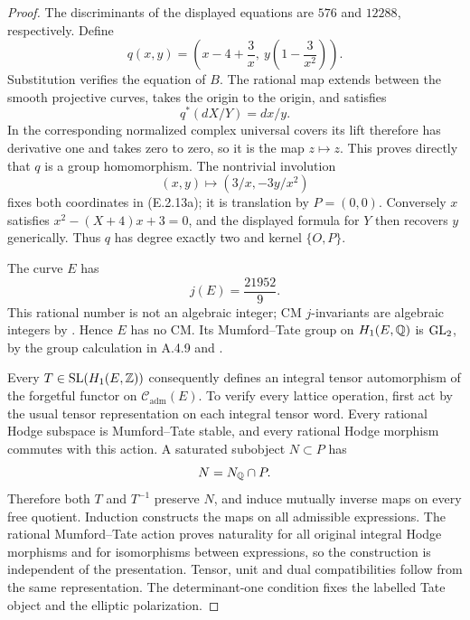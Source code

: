 \begin{proof}
The discriminants of the displayed equations are \(576\) and
\(12288\), respectively. Define
\[
 q(x,y)=
 \left(x-4+\frac3x,\ y\left(1-\frac3{x^2}\right)\right).
 \tag{E.2.13a}
\]
Substitution verifies the equation of \(B\). The rational map extends
between the smooth projective curves, takes the origin to the origin,
and satisfies
\[
 q^*(dX/Y)=dx/y.
\]
In the corresponding normalized complex universal covers its lift
therefore has derivative one and takes zero to zero, so it is the
map \(z\mapsto z\). This proves directly that \(q\) is a group
homomorphism. The nontrivial involution
\[
 (x,y)\longmapsto(3/x,-3y/x^2)
\]
fixes both coordinates in (E.2.13a); it is translation by
\(P=(0,0)\). Conversely \(x\) satisfies
\(x^2-(X+4)x+3=0\), and the displayed formula for \(Y\) then
recovers \(y\) generically. Thus \(q\) has degree exactly two and
kernel \(\{O,P\}\).

The curve \(E\) has
\[
 j(E)=\frac{21952}{9}.
\]
This rational number is not an algebraic integer; CM
\(j\)-invariants are algebraic integers by
\cite[Theorem 12.14 and Corollaries 12.15--12.16,
pp.119--120]{EllMilneMF}. Hence \(E\) has no CM. Its
Mumford--Tate group on \(H_1(E,\mathbb Q)\) is \(\operatorname{GL}_2\), by the group
calculation in A.4.9 and
\cite[Proposition 5.14]{GenKSV2026}.

Every \(T\in\mathrm{SL}(H_1(E,\mathbb Z))\) consequently defines an
integral tensor automorphism of the forgetful functor on
\(\mathcal C_{\mathrm{adm}}(E)\). To verify every lattice operation,
first act by the usual tensor representation on each integral
tensor word. Every rational Hodge subspace is
Mumford--Tate stable, and every rational Hodge morphism commutes
with this action. A saturated subobject \(N\subset P\) has
\[
 N=N_{\mathbb Q}\cap P.
\]
Therefore both \(T\) and \(T^{-1}\) preserve \(N\), and induce
mutually inverse maps on every free quotient. Induction constructs
the maps on all admissible expressions. The rational
Mumford--Tate action proves naturality for all original integral
Hodge morphisms and for isomorphisms between expressions, so the
construction is independent of the presentation. Tensor, unit and
dual compatibilities follow from the same representation.
The determinant-one condition fixes the labelled Tate object
and the elliptic polarization.


\end{proof}
